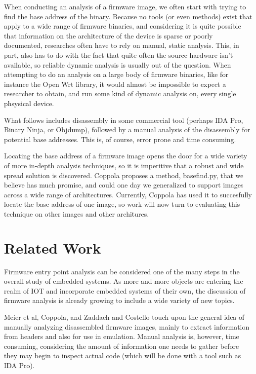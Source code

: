 \documentclass[letterpaper,twocolumn,10pt]{article}
\begin{document}
When conducting an analysis of a firmware image, we often start with trying to find the base address of the binary. Because no tools (or even methods) exist that apply to a wide range of firmware binaries, and considering it is quite possible that information on the architecture of the device is sparse or poorly documented, researches often have to rely on manual, static analysis. This, in part, also has to do with the fact that quite often the source hardware isn't available, so reliable dynamic analysis is usually out of the question. When attempting to do an analysis on a large body of firmware binaries, like for instance the Open Wrt library, it would almost be impossible to expect a researcher to obtain, and run some kind of dynamic analysis on, every single phsysical device.

What follows includes disassembly in some commercial tool (perhaps IDA Pro, Binary Ninja, or Objdump), followed by a manual analysis of the disassembly for potential base addresses. This is, of course, error prone and time consuming.

Locating the base address of a firmware image opens the door for a wide variety of more in-depth analysis techniques, so it is imperitive that a robust and wide spread solution is discovered. Coppola\cite{cloudscale2013} proposes a method, basefind.py, that we believe has much promise, and could one day we generalized to support images across a wide range of architectures. Currently, Coppola has used it to succesfully locate the base address of one image, so work will now turn to evaluating this technique on other images and other architures.

\section{Related Work}
Firmware entry point analysis can be considered one of the many steps in the overall study of embedded systems. As more and more objects are entering the realm of IOT and incorporate embedded systems of their own, the discussion of firmware analysis is already growing to include a wide variety of new topics. 

Meier et al\cite{fitnesstrackers2016}, Coppola\cite{cloudscale2013}, and Zaddach and Costello\cite{securityfirmwarereverse2013} touch upon the general idea of manually analyzing disassembled firmware images, mainly to extract information from headers and also for use in emulation. Manual analysis is, however, time consuming, considering the amount of information one needs to gather before they may begin to inspect actual code (which will be done with a tool such as IDA Pro). 
\end{document}
